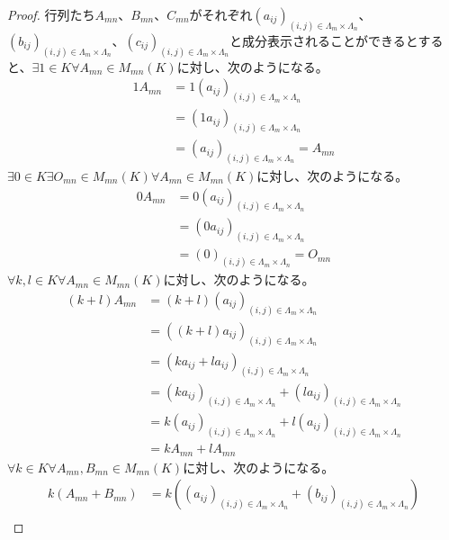 \documentclass[dvipdfmx]{jsarticle}
\begin{document}
\begin{proof}
行列たち$A_{mn}$、$B_{mn}$、$C_{mn}$がそれぞれ$\left( a_{ij} \right)_{(i,j) \in \varLambda_{m} \times \varLambda_{n}}$、$\left( b_{ij} \right)_{(i,j) \in \varLambda_{m} \times \varLambda_{n}}$、$\left( c_{ij} \right)_{(i,j) \in \varLambda_{m} \times \varLambda_{n}}$と成分表示されることができるとすると、$\exists 1 \in K\forall A_{mn} \in M_{mn}(K)$に対し、次のようになる。
\begin{align*}
1A_{mn} &= 1\left( a_{ij} \right)_{(i,j) \in \varLambda_{m} \times \varLambda_{n}}\\
&= \left( 1a_{ij} \right)_{(i,j) \in \varLambda_{m} \times \varLambda_{n}}\\
&= \left( a_{ij} \right)_{(i,j) \in \varLambda_{m} \times \varLambda_{n}} = A_{mn}
\end{align*}
$\exists 0 \in K\exists O_{mn} \in M_{mn}(K)\forall A_{mn} \in M_{mn}(K)$に対し、次のようになる。
\begin{align*}
0A_{mn} &= 0\left( a_{ij} \right)_{(i,j) \in \varLambda_{m} \times \varLambda_{n}}\\
&= \left( 0a_{ij} \right)_{(i,j) \in \varLambda_{m} \times \varLambda_{n}}\\
&= (0)_{(i,j) \in \varLambda_{m} \times \varLambda_{n}} = O_{mn}
\end{align*}
$\forall k,l \in K\forall A_{mn} \in M_{mn}(K)$に対し、次のようになる。
\begin{align*}
(k + l)A_{mn} &= (k + l)\left( a_{ij} \right)_{(i,j) \in \varLambda_{m} \times \varLambda_{n}}\\
&= \left( (k + l)a_{ij} \right)_{(i,j) \in \varLambda_{m} \times \varLambda_{n}}\\
&= \left( ka_{ij} + la_{ij} \right)_{(i,j) \in \varLambda_{m} \times \varLambda_{n}}\\
&= \left( ka_{ij} \right)_{(i,j) \in \varLambda_{m} \times \varLambda_{n}} + \left( la_{ij} \right)_{(i,j) \in \varLambda_{m} \times \varLambda_{n}}\\
&= {k\left( a_{ij} \right)}_{(i,j) \in \varLambda_{m} \times \varLambda_{n}} + l\left( a_{ij} \right)_{(i,j) \in \varLambda_{m} \times \varLambda_{n}}\\
&= kA_{mn} + lA_{mn}
\end{align*}
$\forall k \in K\forall A_{mn},B_{mn} \in M_{mn}(K)$に対し、次のようになる。
\begin{align*}
k\left( A_{mn} + B_{mn} \right) &= k\left( \left( a_{ij} \right)_{(i,j) \in \varLambda_{m} \times \varLambda_{n}} + \left( b_{ij} \right)_{(i,j) \in \varLambda_{m} \times \varLambda_{n}} \right)\\

\end{align*}
\end{proof}
\end{document}
